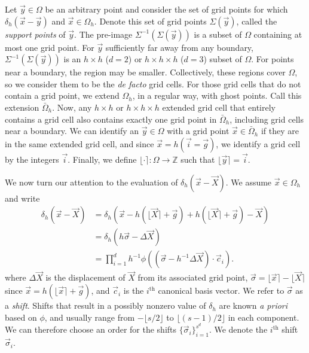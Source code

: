 Let $\vec{y}\in\Omega$ be an arbitrary point and consider the set of grid
points for which $\delta_h(\vec{x}-\vec{y})$ and $\vec{x}\in\Omega_h$. Denote
this set of grid points $\Sigma(\vec{y})$, called the \emph{support points}
of $\vec{y}$. The pre-image $\Sigma^{-1}(\Sigma(\vec{y}))$ is a subset of
$\Omega$ containing at most one grid point. For $\vec{y}$ sufficiently far away
from any boundary, $\Sigma^{-1}(\Sigma(\vec{y}))$ is an $h \times h$ ($d=2$) or
$h \times h \times h$ ($d=3$) subset of $\Omega$. For points near a boundary,
the region may be smaller. Collectively, these regions cover $\Omega$, so we
consider them to be the \emph{de facto} grid cells. For those grid cells that
do not contain a grid point, we extend $\Omega_h$, in a regular way, with ghost
points. Call this extension $\bar{\Omega}_h$. Now, any $h \times h$ or
$h \times h \times h$ extended grid cell that entirely contains a grid cell
also contains exactly one grid point in $\bar{\Omega}_h$, including grid cells
near a boundary. We can identify an $\vec{y}\in\Omega$ with a grid point
$\vec{x}\in\bar{\Omega}_h$ if they are in the same extended grid cell, and
since $\vec{x}=h(\vec{i}=\vec{g})$, we identify a grid cell by the integers
$\vec{i}$. Finally, we define $\lfloor\cdot\rceil:\Omega\to\mathbb{Z}$ such
that $\lfloor\vec{y}\rceil = \vec{i}$.

We now turn our attention to the evaluation of $\delta_h(\vec{x}-\vec{X})$. We
assume $\vec{x}\in\Omega_h$ and write
\begin{equation}
    \label{eq:delta-defs}
    \begin{aligned}
        \delta_h(\vec{x}-\vec{X})
        &= \delta_h(\vec{x}-h(\lfloor\vec{X}\rceil+\vec{g}) + h(\lfloor\vec{X}\rceil+\vec{g}) - \vec{X}) \\
        &= \delta_h(h\vec{\sigma} - \Delta\vec{X}) \\
        &= \prod_{i=1}^d h^{-1}\phi((\vec{\sigma} - h^{-1}\Delta\vec{X})\cdot\vec{c}_i).
    \end{aligned}
\end{equation}
where $\Delta\vec{X}$ is the displacement of $\vec{X}$ from its associated grid
point, $\vec{\sigma} = \lfloor\vec{x}\rceil-\lfloor\vec{X}\rceil$ since
$\vec{x} = h(\lfloor\vec{x}\rceil+\vec{g})$, and $\vec{c}_i$ is the $i^\text{th}$
canonical basis vector. We refer to $\vec{\sigma}$ as a \emph{shift}. Shifts
that result in a possibly nonzero value of $\delta_h$ are known \emph{a priori}
based on $\phi$, and usually range from $-\lfloor s/2\rfloor$ to
$\lfloor(s-1)/2\rfloor$ in each component. We can therefore choose an order for
the shifts $\{\vec{\sigma}_i\}_{i=1}^{s^d}$. We denote the $i^\text{th}$ shift
$\vec{\sigma}_i$.

